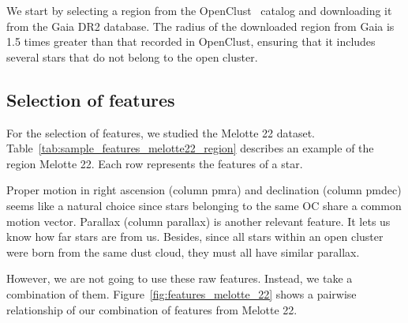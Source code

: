 \documentclass[11pt,a4paper,english,twocolumn]{article}
\begin{document}
We start by selecting a region from the OpenClust~\cite{dias2002new} catalog and
downloading it from the Gaia DR2 database. The radius of the downloaded region from Gaia
is 1.5 times greater than that recorded in OpenClust, ensuring that it includes several
stars that do not belong to the open cluster.

\subsection{Selection of features}
\label{sec:feature_selection}

For the selection of features, we studied the Melotte 22 dataset.
Table~\ref{tab:sample_features_melotte22_region} describes an example of the region Melotte 22.
Each row represents the features of a star.

\begin{table}[!htbp]
  \begin{center}
    \caption{Features of Melotte 22 region.}
    \label{tab:sample_features_melotte22_region}
  \end{center}
\end{table}

Proper motion in right ascension (column pmra) and declination (column pmdec) seems
like a natural choice since stars belonging to the same OC share a common motion vector.
Parallax (column parallax) is another relevant feature. It lets us know how far stars
are from us. Besides, since all stars within an open cluster were born from the same
dust cloud, they must all have similar parallax.

However, we are not going to use these raw features. Instead, we take a combination
of them. Figure~\ref{fig:features_melotte_22} shows a pairwise relationship of our
combination of features from Melotte 22.
\end{document}
